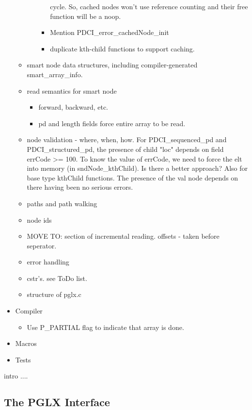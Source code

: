 \documentclass{article}
\begin{document}
\begin{itemize}
\begin{itemize}
\begin{itemize}
\begin{itemize}
        cycle. So, cached nodes won't use reference counting and 
        their free function will be a noop.
      \item Mention PDCI\_error\_cachedNode\_init
      \item duplicate kth-child functions to support caching.
      \end{itemize}
    \end{itemize}
  \item smart node data structures, including compiler-generated smart\_array\_info.
  \item read semantics for smart node
    \begin{itemize}
    \item forward, backward, etc.
    \item pd and length fields force entire array to be read.
    \end{itemize}
  \item node validation - where, when, how.  
    For PDCI\_sequenced\_pd and PDCI\_structured\_pd, the presence of
    child "loc" depends on field errCode >= 100. To know the value of
    errCode, we need to force the elt into memory (in
    sndNode\_kthChild). Is there a better approach?  Also for base type
    kthChild functions. The presence of the val node depends on there
    having been no serious errors.
  \item paths and path walking
  \item node ids
  \item MOVE TO: section of incremental reading.
    offsets - taken before seperator.
  \item error handling
  \item cstr's. see ToDo list.
  \item structure of pglx.c
  \end{itemize}
\item Compiler
  \begin{itemize}
  \item Use P\_PARTIAL flag to indicate that array is done.
  \end{itemize}
\item Macros
\item Tests
\end{itemize}

intro ....


\subsection{The PGLX Interface}
\label{sec:pglx-interface}
\end{document}
